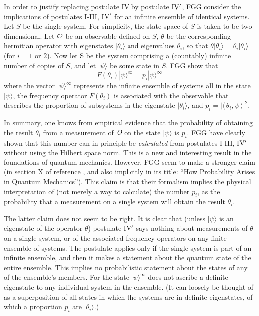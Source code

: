 \documentclass[aps,pra,12pt]{revtex4}
\def\ket#1{| #1\rangle}
\def\inprod#1#2{\langle \,#1 , #2 \,\rangle}
\begin{document}
In order to justify replacing postulate IV by postulate I${\rm
V}^{\prime}$, FGG consider the implications of postulates I-III,
I${\rm V}^{\prime}$ for an infinite ensemble of identical systems.
Let $S$ be the single system.  For simplicity, the state space of $S$
is taken to be two-dimensional.  Let ${\cal O}$ be an observable defined
on $S$, $\theta$ be the corresponding hermitian operator with
eigenstates $\ket {\theta_i}$ and eigenvalues $\theta_i$, so that
$\theta \ket {\theta_i} = \theta_i \ket{\theta_i}$ (for $i = 1$ or
$2$).  Now let S be the system comprising a (countably) infinite
number of copies of $S$, and let $\ket{\psi}$ be some state in $S$.
FGG show that
\begin{equation}\label{eigen}
F( \theta_i ) \ket{\psi}^{\infty} = p_i \ket{\psi}^{\infty}
\end{equation}
where the vector $\ket{\psi}^{\infty}$ represents the infinite
ensemble of systems all in the state $\ket{\psi}$, the frequency
operator $F( \theta_i )$ is associated with the observable that
describes the proportion of subsystems in the eigenstate
$\ket{\theta_i}$, and $p_i = | \inprod{\theta_i}{\psi}|^2$.

In summary, one knows from empirical evidence that the probability of
obtaining the result $\theta_i$ from a measurement of ${\textit O}$ on the
state $\ket{\psi}$ is $p_i$.  FGG have clearly shown that this number
can in principle be {\em calculated} from postulates I-III, I${\rm V}^{\prime}$
without using the Hilbert space norm.  This is a new and interesting
result in the foundations of quantum mechanics.  However, FGG seem to
make a stronger claim (in section X of reference \cite{fgg}, and also
implicitly in its title: ``How Probability Arises in Quantum
Mechanics'').  This claim is that their formalism implies the physical
interpretation of (not merely a way to calculate) the number $p_i$, as
the probability that a measurement on a single system will obtain the
result $\theta_i$.

The latter claim does not seem to be right.  It is clear that (unless
$\ket{\psi}$ is an eigenstate of the operator $\theta$) postulate
I${\rm V}^{\prime}$ says nothing about measurements of $\theta$ on a
single system, or of the associated frequency operators on any finite
ensemble of systems.  The postulate applies only if the single system
is part of an infinite ensemble, and then it makes a statement about
the quantum state of the entire ensemble.  This implies no
probabilistic statement about the states of any of the ensemble's
members.  For the state $\ket{\psi}^{\infty}$ does not ascribe a
definite eigenstate to any individual system in the ensemble.  (It can
loosely be thought of as a superposition of all states in which the
systems are in definite eigenstates, of which a proportion $p_i$ are
$\ket{\theta_i}$.)
\end{document}
